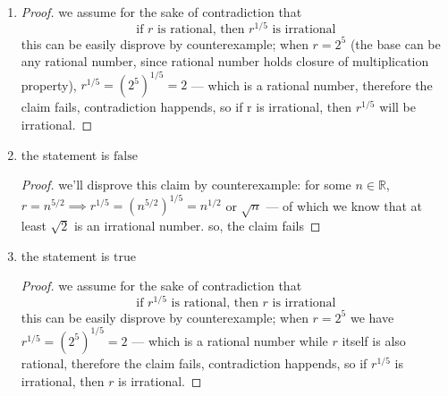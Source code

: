 \medskip
\solution

 \begin{enumerate}
      \item
      \begin{proof}
      we assume for the sake of contradiction that
      \[
      \text{if }r\text{ is rational, then }r^{1/5}\text{ is irrational}
      \]
      this can be easily disprove by counterexample; when $r = 2^5$
  (the base can be any rational number, since rational number holds
  closure of multiplication property), $r^{1/5} = (2^5)^{1/5} = 2$ ---
  which is a rational number, therefore the claim fails, contradiction
  happends, so if r is irrational, then $r^{1/5}$ will be irrational.
      \end{proof}
      \item the statement is $\boxed{\text{false}}$
      \begin{proof}
      we'll disprove this claim by counterexample: for
  some $n \in \mathbb{R}$, $r = n^{5/2} \implies r^{1/5} =
  \left(n^{5/2}\right)^{1/5} = n^{1/2}$ or $\sqrt{n}$ --- of which we
  know that at least $\sqrt{2}$ is an irrational number. so, the claim
  fails
      \end{proof}
      
        \item the statement is $\boxed{\text{true}}$
      \begin{proof}
      we assume for the sake of contradiction that
      \[
      \text{if }r^{1/5}\text{ is rational, then }r\text{ is irrational}
      \]
      this can be easily disprove by counterexample; when $r = 2^5$ we have
      $r^{1/5} = (2^5)^{1/5} = 2$ --- which is a rational number while $r$
      itself is also rational, therefore the claim fails, contradiction
      happends, so if $r^{1/5}$ is irrational, then $r$ is irrational.
      \end{proof}
  \end{enumerate}

\vspace{1em}
\hrulefill


